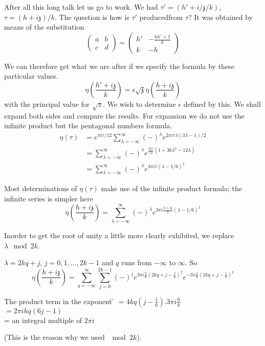 After all this long talk let us go to work. We had $\tau' = (h' +
i/\mathfrak{z}/k)$, $\tau = (h+ i\mathfrak{z})/k$. The question is how
is $\tau'$ produced\pageoriginale from $\tau$? It was obtained by
means of the substitution
$$
\begin{pmatrix}
  a & b\\ c & d
\end{pmatrix}= 
\begin{pmatrix}
  h' & -\frac{hh'+1}{k}\\ k & -h
\end{pmatrix}
$$

We can therefore get what we are after if we specify the formula by
these particular values.
$$
\eta \left( \frac{h' + i \mathfrak{z}}{k}\right)= \epsilon
\sqrt{\mathfrak{z}} \eta \left(\frac{h+ i \mathfrak{z}}{k} \right)
$$
with the principal value for $\sqrt{z}$. We wish to determine $\epsilon $
defined by this. We shall expand both sides and compare the
results. For expansion we do not use the infinite product but the
pentagonal numbers formula.
\begin{align*}
  \eta(\tau) & = e^{\pi i \tau/12} \sum^\infty_{\lambda =- \infty}
  (-)^\lambda e^{2 \pi i \tau \lambda (3 \lambda -1)/2}\\
  & = \sum^\infty_{\lambda =- \infty} (-)^\lambda e^{\frac{\pi i
      \tau}{12} (1+ 36 \lambda^2 - 12 \lambda)}\\
  & = \sum^\infty_{\lambda =- \infty} (-)^\lambda e^{3 \pi i \tau
    (\lambda - 1/6)^2}
\end{align*}

Most determinations of $\eta(\tau)$ make use of the infinite product formula;
the infinite series is simpler here
$$
  \eta \left( \frac{h+ i \mathfrak{z}}{k}\right) = \sum^\infty_{\lambda =- \infty}
  (-)^\lambda e^{3 \pi i \frac{h+i\mathfrak{z}}{k} (\lambda -1/6)^2}
$$

In\pageoriginale order to get the root of unity a little more clearly
exhibited, we replace $\lambda \mod 2k$.

$\lambda = 2k q + j$, $j=0,1,\ldots, 2k-1$ and $q$ runs from $-
\infty$ to $\infty$. So
$$
\eta \left( \frac{h+i \mathfrak{z}}{k}\right) =
\sum^\infty_{q=-\infty} \sum^{2k-1}_{j=0} (-)^j e^{3 \pi i \frac{h}{k}
(2 k q + j- \frac{1}{6})^2} e^{-3 \pi \frac{\mathfrak{z}}{k}(2 kq + j-
  \frac{1}{6})^2} 
$$ 

\begin{tabbing} 
  The product term in the exponent \= $= 4 kq (j- \frac{1}{6}). 3 \pi
  i \frac{h}{k}$\\
  \> $= 2 \pi i h q (6j-1)$\\
  \> = an integral multiple of $2 \pi i$
\end{tabbing}
(This is the reason why we used $\mod 2k$).

